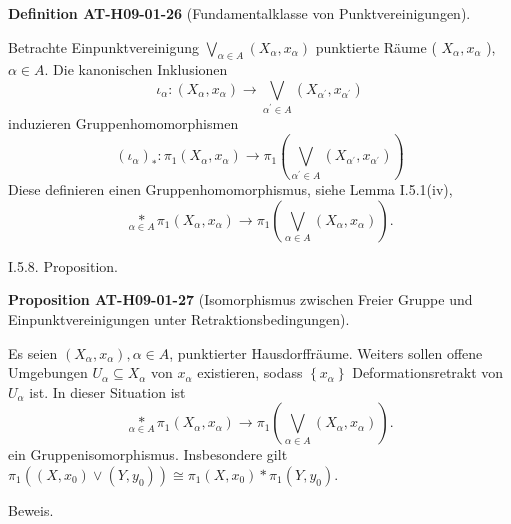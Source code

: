 \documentclass[10pt, letterpaper]{article}
\newcommand{\CustomHeading}[3]{%
  \par\medskip\noindent%
  \textbf{#1 #2} \textnormal{(#3)}.\enskip%
}
\newenvironment{DEF}[2]{\begin{unitbox}\CustomHeading{Definition}{#1}{#2}}{\end{unitbox}}
\newenvironment{PROP}[2]{\begin{unitbox}\CustomHeading{Proposition}{#1}{#2}}{\end{unitbox}}
\begin{document}
\begin{DEF}{AT-H09-01-26}{Fundamentalklasse von Punktvereinigungen}
Betrachte Einpunktvereinigung $\bigvee_{\alpha \in A}\left(X_\alpha, x_\alpha\right)$ punktierte Räume ( $X_\alpha, x_\alpha$ ), $\alpha \in A$. Die kanonischen Inklusionen 
$$\iota_\alpha:\left(X_\alpha, x_\alpha\right) \rightarrow \bigvee_{\alpha^{\prime} \in A}\left(X_{\alpha^{\prime}}, x_{\alpha^{\prime}}\right)$$ 
induzieren Gruppenhomomorphismen 
$$\left(\iota_\alpha\right)_*: \pi_1\left(X_\alpha, x_\alpha\right) \rightarrow \pi_1\left(\bigvee_{\alpha^{\prime} \in A}\left(X_{\alpha^{\prime}}, x_{\alpha^{\prime}}\right)\right)$$
Diese definieren einen Gruppenhomomorphismus, siehe Lemma I.5.1(iv),
$$
\underset{\alpha \in A}{*} \pi_1\left(X_\alpha, x_\alpha\right) \rightarrow \pi_1\left(\bigvee_{\alpha \in A}\left(X_\alpha, x_\alpha\right)\right) .
$$
\end{DEF}


I.5.8. Proposition. 


\begin{PROP}{AT-H09-01-27}{Isomorphismus zwischen Freier Gruppe und Einpunktvereinigungen unter Retraktionsbedingungen}
Es seien $\left(X_\alpha, x_\alpha\right), \alpha \in A$, punktierter Hausdorffräume. Weiters sollen offene Umgebungen $U_\alpha \subseteq X_\alpha$ von $x_\alpha$ existieren, sodass $\left\{x_\alpha\right\}$ Deformationsretrakt von $U_\alpha$ ist. In dieser Situation ist 
$$
\underset{\alpha \in A}{*} \pi_1\left(X_\alpha, x_\alpha\right) \rightarrow \pi_1\left(\bigvee_{\alpha \in A}\left(X_\alpha, x_\alpha\right)\right) .
$$
ein Gruppenisomorphismus. Insbesondere gilt $\pi_1\left(\left(X, x_0\right) \vee\left(Y, y_0\right)\right) \cong \pi_1\left(X, x_0\right) * \pi_1\left(Y, y_0\right)$.
\end{PROP}


Beweis. 
\end{document}
